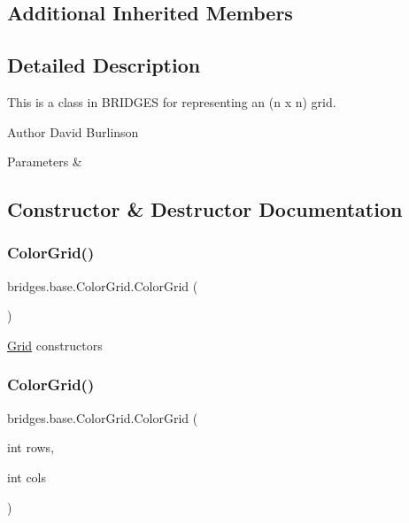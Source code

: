 \subsection*{Additional Inherited Members}


\subsection{Detailed Description}
This is a class in B\+R\+I\+D\+G\+ES for representing an (n x n) grid. 

\begin{DoxyAuthor}{Author}
David Burlinson 
\end{DoxyAuthor}

\begin{DoxyParams}{Parameters}
{\em } & \\
\hline
\end{DoxyParams}


\subsection{Constructor \& Destructor Documentation}
\mbox{\label{classbridges_1_1base_1_1_color_grid_af434a5a3dcbaf86e51ac6f9e1c1d7e5f}} 
\subsubsection{\texorpdfstring{ColorGrid()}{ColorGrid()}\hspace{0.1cm}{\footnotesize\ttfamily [1/3]}}
{\footnotesize\ttfamily bridges.\+base.\+Color\+Grid.\+Color\+Grid (\begin{DoxyParamCaption}{ }\end{DoxyParamCaption})}

\mbox{\hyperlink{classbridges_1_1base_1_1_grid}{Grid}} constructors \mbox{\label{classbridges_1_1base_1_1_color_grid_aafb4157a4c8129f30c1f989fcdfda544}} 
\subsubsection{\texorpdfstring{ColorGrid()}{ColorGrid()}\hspace{0.1cm}{\footnotesize\ttfamily [2/3]}}
{\footnotesize\ttfamily bridges.\+base.\+Color\+Grid.\+Color\+Grid (\begin{DoxyParamCaption}\item[{int}]{rows,  }\item[{int}]{cols }\end{DoxyParamCaption})}

